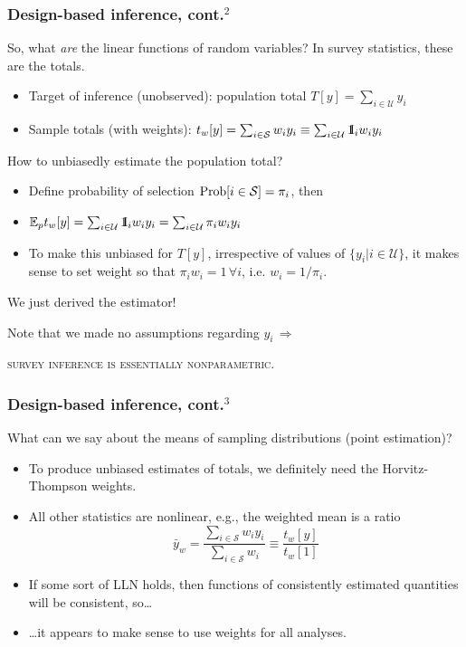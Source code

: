 \documentclass[handout]{beamer}
\newcommand{\Expect}{\mathbb{E}}
\newcommand{\One}{{\rm 1\kern-0.3em I}}
\begin{document}
\begin{frame}\frametitle{Design-based inference, cont.$^2$}

So, what \textit{are} the linear functions of random variables? In survey statistics, these are the totals.

\begin{itemize}
    \item Target of inference (unobserved): population total $T[y] = \sum_{i\in\mathcal{U}} y_i$
    \item Sample totals (with weights): $t_w[y] = \sum_{i\in\mathcal{S}} w_i y_i \equiv \sum_{i\in\mathcal{U}} \One_i w_i y_i$
\end{itemize}

How to unbiasedly estimate the population total?
\begin{itemize}
    \item Define probability of selection ${\rm Prob}[i\in\mathcal{S}]=\pi_i$, then
    \item $\Expect_p t_w[y] = \sum_{i\in\mathcal{U}} \One_i w_i y_i = \sum_{i\in\mathcal{U}} \pi_i w_i y_i$
    \item To make this unbiased for $T[y]$, irrespective of values of $\{ y_i| i\in \mathcal{U}\}$,
        it makes sense to set weight so that $\pi_i w_i = 1 \, \forall i$, i.e. $w_i = 1/\pi_i$.
\end{itemize}

We just derived the \citet{horvitz:thompson:1952} estimator!

\bigskip

Note that we made no assumptions regarding $y_i \, \Rightarrow$

\centering

\textsc{survey inference is essentially nonparametric}.

\end{frame}

\begin{frame}\frametitle{Design-based inference, cont.$^3$}

What can we say about the means of sampling distributions (point estimation)?

\begin{itemize}
    \item To produce unbiased estimates of totals, we definitely need the Horvitz-Thompson weights.
    \item All other statistics are nonlinear, e.g., the weighted mean is a ratio
        $$ \bar y_w = \frac{\sum_{i\in\mathcal{S}} w_i y_i}{\sum_{i\in\mathcal{S}} w_i} \equiv \frac{t_w[y]}{t_w[1]} $$
    \item If some sort of LLN holds, then functions of consistently estimated quantities
        will be consistent, so\ldots
    \item \ldots it appears to make sense to use weights for all analyses.
\end{itemize}

\end{frame}
\end{document}
